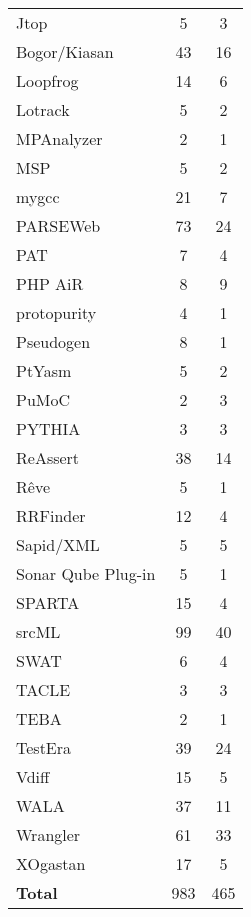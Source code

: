 \begin{longtable}{ l c c }
   Jtop & 5 & 3 \\
   Bogor/Kiasan & 43 & 16 \\
   Loopfrog & 14 & 6 \\
   Lotrack & 5 & 2 \\
   MPAnalyzer & 2 & 1 \\
   MSP & 5 & 2 \\
   mygcc & 21 & 7 \\
   PARSEWeb & 73 & 24 \\
   PAT & 7 & 4 \\
   PHP AiR & 8 & 9 \\
   protopurity & 4 & 1 \\
   Pseudogen & 8 & 1 \\
   PtYasm & 5 & 2 \\
   PuMoC & 2 & 3 \\
   PYTHIA & 3 & 3 \\
   ReAssert & 38 & 14 \\
   Rêve & 5 & 1 \\
   RRFinder & 12 & 4 \\
   Sapid/XML & 5 & 5 \\
   Sonar Qube Plug-in & 5 & 1 \\
   SPARTA & 15 & 4 \\
   srcML & 99 & 40 \\
   SWAT & 6 & 4 \\
   TACLE & 3 & 3 \\
   TEBA & 2 & 1 \\
   TestEra & 39 & 24 \\
   Vdiff & 15 & 5 \\
   WALA & 37 & 11 \\
   Wrangler & 61 & 33 \\
   XOgastan & 17 & 5 \\
  \hline
  {\bf Total} & 983 & 465 \\
\end{longtable}


